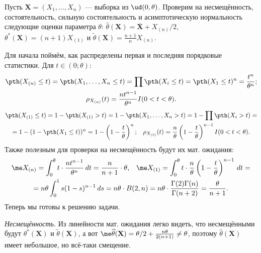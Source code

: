\begin{example}\label{example_of_properties}
    Пусть $\mathbf X = (X_1, \ldots, X_n)$ --- выборка из $\ud(0, \theta)$. Проверим на несмещённость, состоятельность, сильную состоятельность и асимптотическую нормальность следующие оценки параметра $\theta$: $\widehat{\theta}(\mathbf X) = \overline{\mathbf X} + X_{(n)}/2$, $\theta^*(\mathbf X) = (n + 1)X_{(1)}$ и $\widetilde{\theta}(\mathbf X) = \frac{n+1}{n} X_{(n)}$.

    Для начала поймём, как распределены первая и последняя порядковые статистики. Для $t \in (0; \theta)$:
    \begin{gather*}
        \pth(X_{(n)} \le t) = \pth(X_1, \ldots, X_n \le t) = \prod \pth(X_i \le t) = \pth(X_1 \le t)^n = \frac{t^n}{\theta^n};\\
        \rho_{X_{(n)}}(t) = \frac{nt^{n-1}}{\theta^n}I(0 < t < \theta).
    \end{gather*}
    \begin{gather*}
        \pth(X_{(1)} \le t) = 1 - \pth(X_{(1)} > t) = 1 - \pth(X_1, \ldots, X_n > t) = 1 - \prod \pth(X_i > t) =\\
        = 1 - (1 - \pth(X_1 \le t))^n = 1 - \left(1 - \frac{t}{\theta}\right)^n;\;\;\; \rho_{X_{(1)}}(t) = \frac{n}{\theta}\left(1 - \frac{t}{\theta}\right)^{n-1} I(0 < t < \theta).
    \end{gather*}
    Также полезным для проверки на несмещённость будут их мат. ожидания:
    \begin{gather*}
        \me X_{(n)} = \int_0^{\theta} t \cdot \frac{nt^{n-1}}{\theta^n}\,dt = \frac{n}{n+1} \cdot \theta, \;\;\; \me X_{(1)} = \int_0^{\theta} t \cdot \frac{n}{\theta}\left(1 - \frac{t}{\theta}\right)^{n-1}\,dt = \\
        = n\theta \int_0^1 s(1-s)^{n-1}\,ds = n\theta \cdot B(2, n) = n\theta \cdot \frac{\Gamma(2)\Gamma(n)}{\Gamma(n+2)} = \frac{\theta}{n+1}.
    \end{gather*}
    Теперь мы готовы к решению задачи.
    
    \textit{Несмещённость.} Из линейности мат. ожидания легко видеть, что несмещёнными будут $\theta^*(\mathbf X)$ и $\widetilde{\theta}(\mathbf X)$, а вот $\me \widehat{\theta}(\mathbf X) = \theta / 2 + \frac{n\theta}{2(n+1)} \ne \theta$, поэтому $\widehat{\theta}(\mathbf X)$ имеет небольшое, но всё-таки смещение.
    

\end{example}
